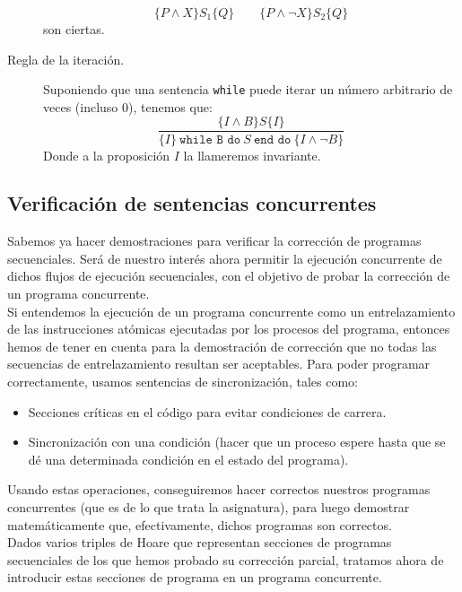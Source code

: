 \begin{description}
        \begin{equation*}
            \{P\land X\}S_1\{Q\}\qquad \{P\land \lnot X\}S_2\{Q\}
        \end{equation*}
        son ciertas.
    \item [Regla de la iteración.] 
        Suponiendo que una sentencia \verb|while| puede iterar un número arbitrario de veces (incluso 0), tenemos que:
        \begin{equation*}
            \dfrac{\{I\land B\}S\{I\}}{\{I\}\ \texttt{while B do}\ S\ \texttt{end do}\ \{I\land \lnot B\}}
        \end{equation*}
        Donde a la proposición $I$ la llameremos invariante.
\end{description}

\subsection{Verificación de sentencias concurrentes}
Sabemos ya hacer demostraciones para verificar la corrección de programas secuenciales. Será de nuestro interés ahora permitir la ejecución concurrente de dichos flujos de ejecución secuenciales, con el objetivo de probar la corrección de un programa concurrente.\\

Si entendemos la ejecución de un programa concurrente como un entrelazamiento de las instrucciones atómicas ejecutadas por los procesos del programa, entonces hemos de tener en cuenta para la demostración de corrección que no todas las secuencias de entrelazamiento resultan ser aceptables. Para poder programar correctamente, usamos sentencias de sincronización, tales como:
\begin{itemize}
    \item Secciones críticas en el código para evitar condiciones de carrera.
    \item Sincronización con una condición (hacer que un proceso espere hasta que se dé una determinada condición en el estado del programa).
\end{itemize}
Usando estas operaciones, conseguiremos hacer correctos nuestros programas concurrentes (que es de lo que trata la asignatura), para luego demostrar matemáticamente que, efectivamente, dichos programas son correctos.\\

Dados varios triples de Hoare que representan secciones de programas secuenciales de los que hemos probado su corrección parcial, tratamos ahora de introducir estas secciones de programa en un programa concurrente.

